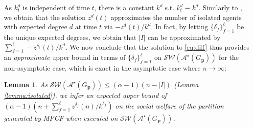 \documentclass[letterpaper]{article} %
\newtheorem{lemma}{Lemma}
\begin{document}
As $k_t^d$ is independent of time $t$, there is a constant $k^d$ s.t. $k_t^d \equiv k^d$. Similarly to \cite[Theorem 6.1]{aamand2022optimal}, we obtain that the solution $z^d(t)$ approximates the number of isolated agents with expected degree $d$ at time $t$ via $-z^d(t)/k^d$. In fact, by letting $\{\delta_f\}_{f=1}^\ell$ be the unique expected degrees, we obtain that $|I|$ can be approximated by $\sum_{f=1}^\ell -z^{\delta_f}(t)/k^d$. We now conclude that the solution to \eqref{eq:diff} thus provides an \textit{approximate} upper bound in terms of $\{\delta_f\}_{f=1}^\ell$ on $\mathcal{SW}(\mathcal{A}^\star(G_\mathbf{p}))$ for the non-asymptotic case, which is exact in the asymptotic case where $n \rightarrow \infty$: %
\begin{lemma}
    \label{lemma:expected upper bound}
    As $\mathcal{SW}(\mathcal{A}^\star(G_\mathbf{p})) \leq  (\alpha-1) (n-|I|)$ (Lemma \ref{lemma:isolated}), we infer an expected upper bound of $(\alpha-1) (n+\sum_{f=1}^\ell z^{\delta_f}(n)/k^{\delta_f})$ on the social welfare of the partition generated by MPCF when executed on $\mathcal{SW}(\mathcal{A}^\star(G_\mathbf{p}))$.
\end{lemma}
\end{document}
